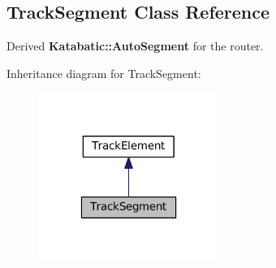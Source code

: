 \hypertarget{classKite_1_1TrackSegment}{}\subsection{Track\+Segment Class Reference}
\label{classKite_1_1TrackSegment}


Derived \textbf{ Katabatic\+::\+Auto\+Segment} for the router.  




Inheritance diagram for Track\+Segment\+:\nopagebreak
\begin{figure}[H]
\begin{center}
\leavevmode
\includegraphics[width=166pt]{classKite_1_1TrackSegment__inherit__graph}
\end{center}
\end{figure}
